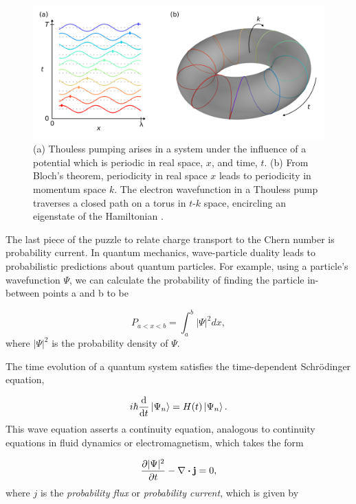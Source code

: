 \documentclass{beavtex_dub_edit}
\begin{document}
\begin{figure}
    \includegraphics[width = 1\textwidth]{Thouless pump fig.png}
    \caption{(a) Thouless pumping arises in a system under the influence of a potential which is periodic in real space, $x$, and time, $t$. (b) From Bloch's theorem, periodicity in real space $x$ leads to periodicity in momentum space $k$. The electron wavefunction in a Thouless pump traverses a closed path on a torus in $t\textrm{-}k$ space, encircling an eigenstate of the Hamiltonian \cite{thouless_quantization_1983}.}
    \label{thouless pump torus}
\end{figure}

The last piece of the puzzle to relate charge transport to the Chern number is probability current. In quantum mechanics, wave-particle duality leads to probabilistic predictions about quantum particles. For example, using a particle's wavefunction $\Psi$, we can calculate the probability of finding the particle in-between points a and b to be 

\begin{equation}
    P_{a<x<b} = \int_{a}^{b} |\Psi|^2dx,
\end{equation}
where $|\Psi|^2$ is the probability density of $\Psi$. 

The time evolution of a quantum system satisfies the time-dependent Schrödinger equation,

\begin{equation}
    i \hbar \derivative{t}\ket{\Psi_n} = H(t)\ket{\Psi_n}.
\end{equation}
This wave equation asserts a continuity equation, analogous to continuity equations in fluid dynamics or electromagnetism, which takes the form \cite{sakurai_modern_1985}

\begin{equation}
    \pdv{|\Psi|^2}{t} -\nabla \dotproduct \vectorbold{j} = 0, \label{continuity eqn for probability}
\end{equation}
where $j$ is the \textit{probability flux} or \textit{probability current}, which is given by
\end{document}
